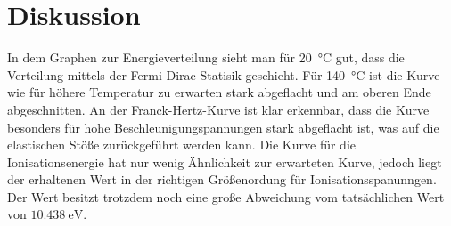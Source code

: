 \section{Diskussion}
\label{sec:Diskussion}
In dem Graphen zur Energieverteilung sieht man für \SI{20}{\degreeCelsius} gut, dass die Verteilung mittels der Fermi-Dirac-Statisik geschieht.
Für \SI{140}{\degreeCelsius} ist die Kurve wie für höhere Temperatur zu erwarten stark abgeflacht und am oberen Ende abgeschnitten.
An der Franck-Hertz-Kurve ist klar erkennbar, dass die Kurve besonders für hohe Beschleunigungspannungen stark abgeflacht ist, was auf die elastischen Stöße zurückgeführt werden kann.
Die Kurve für die Ionisationsenergie hat nur wenig Ähnlichkeit zur erwarteten Kurve, jedoch liegt der erhaltenen Wert in der richtigen Größenordung für Ionisationsspanunngen.
Der Wert besitzt trotzdem noch eine große Abweichung vom tatsächlichen Wert von $\SI{10.438}{\electronvolt}$\cite{hg}.
